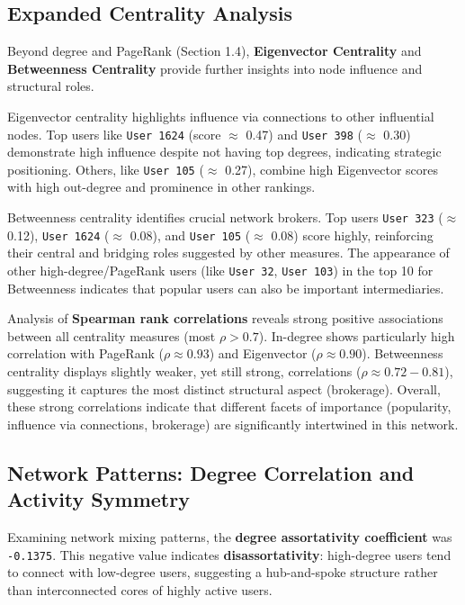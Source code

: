 \subsection{Expanded Centrality Analysis}
\label{sec:centrality_analysis}

Beyond degree and PageRank (Section 1.4), \textbf{Eigenvector Centrality} and \textbf{Betweenness Centrality} provide further insights into node influence and structural roles.

Eigenvector centrality highlights influence via connections to other influential nodes. Top users like \texttt{User 1624} (score $\approx$ 0.47) and \texttt{User 398} ($\approx$ 0.30) demonstrate high influence despite not having top degrees, indicating strategic positioning. Others, like \texttt{User 105} ($\approx$ 0.27), combine high Eigenvector scores with high out-degree and prominence in other rankings.

Betweenness centrality identifies crucial network brokers. Top users \texttt{User 323} ($\approx$ 0.12), \texttt{User 1624} ($\approx$ 0.08), and \texttt{User 105} ($\approx$ 0.08) score highly, reinforcing their central and bridging roles suggested by other measures. The appearance of other high-degree/PageRank users (like \texttt{User 32}, \texttt{User 103}) in the top 10 for Betweenness indicates that popular users can also be important intermediaries.

Analysis of \textbf{Spearman rank correlations} reveals strong positive associations between all centrality measures (most $\rho > 0.7$). In-degree shows particularly high correlation with PageRank ($\rho \approx 0.93$) and Eigenvector ($\rho \approx 0.90$). Betweenness centrality displays slightly weaker, yet still strong, correlations ($\rho \approx 0.72 - 0.81$), suggesting it captures the most distinct structural aspect (brokerage). Overall, these strong correlations indicate that different facets of importance (popularity, influence via connections, brokerage) are significantly intertwined in this network.
\subsection{Network Patterns: Degree Correlation and Activity Symmetry}
\label{sec:degree_patterns}

Examining network mixing patterns, the \textbf{degree assortativity coefficient} was \texttt{-0.1375}. This negative value indicates \textbf{disassortativity}: high-degree users tend to connect with low-degree users, suggesting a hub-and-spoke structure rather than interconnected cores of highly active users.

